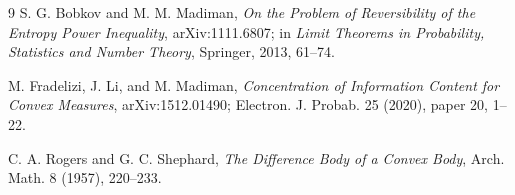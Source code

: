 \documentclass[11pt]{article}
\begin{document}
\begin{thebibliography}{9}
S. G. Bobkov and M. M. Madiman,
\emph{On the Problem of Reversibility of the Entropy Power Inequality},
arXiv:1111.6807; in \emph{Limit Theorems in Probability, Statistics and
Number Theory}, Springer, 2013, 61--74.

M. Fradelizi, J. Li, and M. Madiman,
\emph{Concentration of Information Content for Convex Measures},
arXiv:1512.01490; Electron. J. Probab. 25 (2020), paper 20, 1--22.

C. A. Rogers and G. C. Shephard,
\emph{The Difference Body of a Convex Body},
Arch. Math. 8 (1957), 220--233.
\end{thebibliography}
\end{document}
